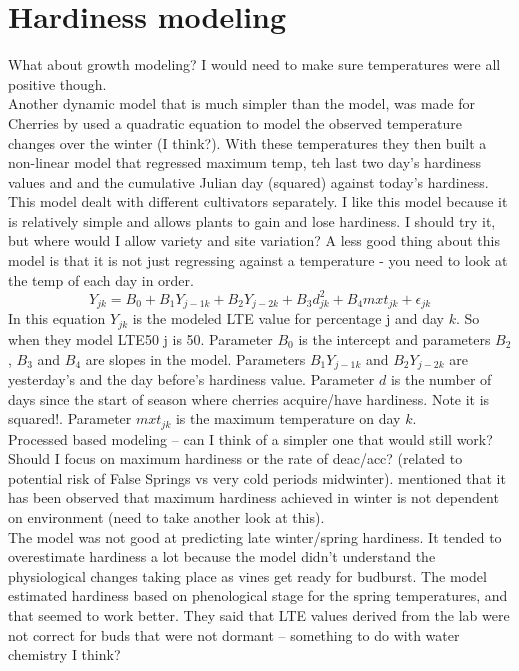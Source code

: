\documentclass[11pt,letter]{article}
\begin{document}
\section{Hardiness modeling}

What about growth modeling? I would need to make sure temperatures were all positive though. \\

Another dynamic model that is much simpler than the \cite{Ferguson2011} model, was made for Cherries by \cite{Salazar-Gutierrez2020} used a quadratic equation to model the observed temperature changes over the winter (I think?). With these temperatures they then built a non-linear model that regressed maximum temp, teh last two day's hardiness values and and the cumulative Julian day (squared) against today's hardiness. This model dealt with different cultivators separately. I like this model because it is relatively simple and allows plants to gain and lose hardiness. I should try it, but where would I allow variety and site variation? A less good thing about this model is that it is not just regressing against a temperature - you need to look at the temp of each day in order. 
\begin{equation*}
Y_{jk} = B_{0} + B_{1}Y_{j-1k} + B_{2}Y_{j-2k} + B_{3}d^{2}_{jk} + B_{4}mxt_{jk} + \epsilon_{jk} 
\end{equation*} 
In this equation $Y_{jk}$ is the modeled LTE value for percentage j and day $k$. So when they model LTE50 j is 50. Parameter $B_{0}$ is the intercept and parameters $B_{2}$, $B_{3}$ and $B_{4}$ are slopes in the model. Parameters $B_{1}Y_{j-1k}$ and $B_{2}Y_{j-2k}$ are yesterday's and the day before's hardiness value. Parameter $d$ is the number of days since the start of season where cherries acquire/have hardiness. Note it is squared!. Parameter $mxt_{jk}$ is the maximum temperature on day $k$. \\

Processed based modeling – can I think of a simpler one that would still work? \\

Should I focus on maximum hardiness or the rate of deac/acc? (related to potential risk of False Springs vs very cold periods midwinter). \cite{Charrier2013} mentioned that it has been observed that maximum hardiness achieved in winter is not dependent on environment (need to take another look at this).\\

The \cite{Ferguson2011} model was not good at predicting late winter/spring hardiness. It tended to overestimate hardiness a lot because the model didn't understand the physiological changes taking place as vines get ready for budburst. The \cite{Ferguson2014} model estimated hardiness based on phenological stage for the spring temperatures, and that seemed to work better. They said that LTE values derived from the lab were not correct for buds that were not dormant – something to do with water chemistry I think?\\
\end{document}
